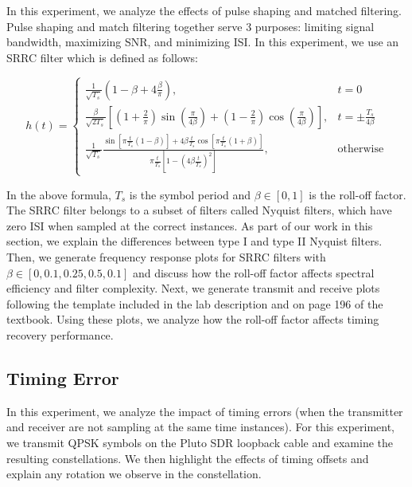 \documentclass{article}
\begin{document}
In this experiment, we analyze the effects of pulse shaping and matched filtering. Pulse shaping and match filtering together serve 3 purposes: limiting signal bandwidth, maximizing SNR, and minimizing ISI. In this experiment, we use an SRRC filter which is defined as follows:

\begin{equation}
	h(t) = \begin{cases}
		\frac{1}{\sqrt{T_s}}\left(1 - \beta + 4\frac{\beta}{\pi}\right), & t = 0 \\
		\frac{\beta}{\sqrt{2T_s}}\left[\left(1 + \frac{2}{\pi}\right)\sin\left(\frac{\pi}{4\beta}\right)+ \left(1-\frac{2}{\pi}\right)\cos\left(\frac{\pi}{4\beta}\right)\right], & t = \pm\frac{T_s}{4\beta} \\
		\frac{1}{\sqrt{T_s}}\frac{\sin\left[\pi\frac{t}{T_s}(1-\beta)\right]+4\beta\frac{t}{T_s}\cos\left[\pi\frac{t}{T_s}(1+\beta)\right]}{\pi\frac{t}{T_s}\left[1 - \left(4\beta\frac{t}{T_s}\right)^2\right]}, & \text{otherwise}
	\end{cases}
	\label{eq::srrc_filter}
\end{equation}

\noindent In the above formula, $T_s$ is the symbol period and $\beta \in [0,1]$ is the roll-off factor. The SRRC filter belongs to a subset of filters called Nyquist filters, which have zero ISI when sampled at the correct instances. As part of our work in this section, we explain the differences between type I and type II Nyquist filters. Then, we generate frequency response plots for SRRC filters with $\beta \in [0, 0.1, 0.25, 0.5, 0.1]$ and discuss how the roll-off factor affects spectral efficiency and filter complexity. Next, we generate transmit and receive plots following the template included in the lab description and on page 196 of the textbook. Using these plots, we analyze how the roll-off factor affects timing recovery performance.

\subsection{Timing Error}

In this experiment, we analyze the impact of timing errors (when the transmitter and receiver are not sampling at the same time instances). For this experiment, we transmit QPSK symbols on the Pluto SDR loopback cable and examine the resulting constellations. We then highlight the effects of timing offsets and explain any rotation we observe in the constellation.
\end{document}
